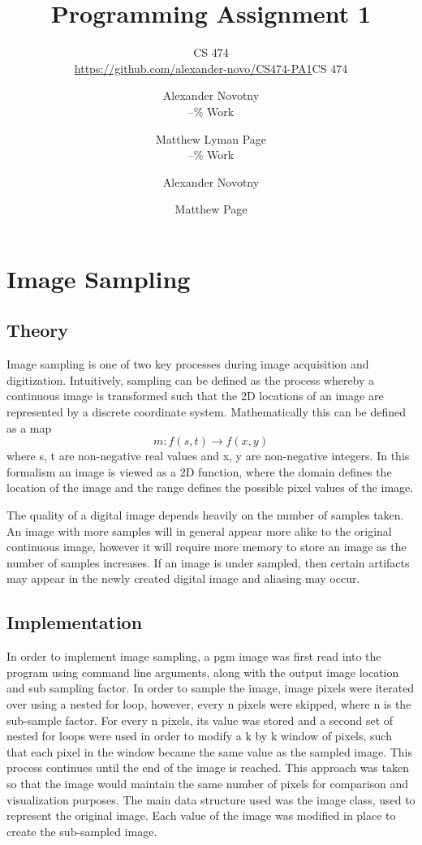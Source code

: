 \documentclass[headings=optiontoheadandtoc,listof=totoc,parskip=full]{scrartcl}
\title{Programming Assignment 1}
\subtitle{CS 474\\\url{https://github.com/alexander-novo/CS474-PA1}}
\author{Alexander Novotny\\--\% Work \and Matthew Lyman Page\\--\% Work}
\subtitle{CS 474}
\author{Alexander Novotny \and Matthew Page}
\begin{document}
\maketitle
\tableofcontents

\newpage

\section{Image Sampling}

\subsection{Theory}
Image sampling is one of two key processes during image acquisition and digitization. Intuitively, sampling can be defined as the process whereby a continuous image is transformed such that the 2D locations of an image are represented by a discrete coordinate system. Mathematically this can be defined as a map \[
	m:f(s, t) \rightarrow f(x, y)
\]where s, t are non-negative real values and x, y are non-negative integers. In this formalism an image is viewed as a 2D function, where the domain defines the location of the image and the range defines the possible pixel values of the image.

The quality of a digital image depends heavily on the number of samples taken. An image with more samples will in general appear more alike to the original continuous image, however it will require more memory to store an image as the number of samples increases. If an image is under sampled, then certain artifacts may appear in the newly created digital image and aliasing may occur.

\subsection{Implementation}
In order to implement image sampling, a pgm image was first read into the program using command line arguments, along with the output image location and sub sampling factor. In order to sample the image, image pixels were iterated over using a nested for loop, however, every n pixels were skipped, where n is the sub-sample factor. For every n pixels, its value was stored and a second set of nested for loops were used in order to modify a k by k window of pixels, such that each pixel in the window became the same value as the sampled image. This process continues until the end of the image is reached. This approach was taken so that the image would maintain the same number of pixels for comparison and visualization purposes. The main data structure used was the image class, used to represent the original image. Each value of the image was modified in place to create the sub-sampled image.
\end{document}
